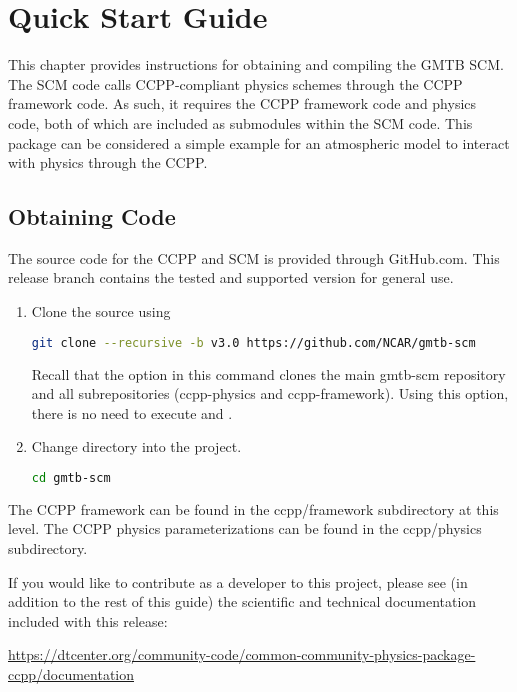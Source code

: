 \chapter{Quick Start Guide}
\label{chapter: quick}

This chapter provides instructions for obtaining and compiling the GMTB SCM. The SCM code calls CCPP-compliant physics schemes through the CCPP framework code. As such, it requires the CCPP framework code and physics code, both of which are included as submodules within the SCM code. This package can be considered a simple example for an atmospheric model to interact with physics through the CCPP.

\section{Obtaining Code}

The source code for the CCPP and SCM is provided through GitHub.com.  This release branch contains the tested and supported version for general use.

\begin{enumerate}
    \item Clone the source using
\begin{lstlisting}[language=bash]
git clone --recursive -b v3.0 https://github.com/NCAR/gmtb-scm
\end{lstlisting}
             Recall that the  option in this command clones the main gmtb-scm repository and all subrepositories (ccpp-physics and ccpp-framework). Using this option, there is no need to execute  and .
    \item Change directory into the project.
\begin{lstlisting}[language=bash]
cd gmtb-scm
\end{lstlisting}
\end{enumerate}

The CCPP framework can be found in the ccpp/framework subdirectory at this level.  The CCPP physics parameterizations can be found in the ccpp/physics subdirectory.

If you would like to contribute as a developer to this project, please see (in addition to the rest of this guide) the scientific and technical documentation included with this release:

\url{https://dtcenter.org/community-code/common-community-physics-package-ccpp/documentation}

